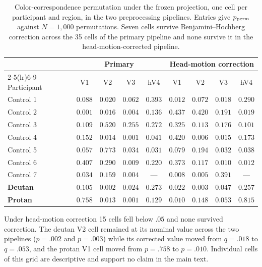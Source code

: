 \begin{table}[h]
\centering
\caption{Color-correspondence permutation under the frozen projection, one cell per participant and region, in the two preprocessing pipelines. Entries give $p_{\rm perm}$ against $N = 1{,}000$ permutations. Seven cells survive Benjamini--Hochberg correction across the 35 cells of the primary pipeline and none survive it in the head-motion-corrected pipeline.}
\label{tab:color_specificity}
\begin{tabular}{lcccccccc}
\toprule
 & \multicolumn{4}{c}{Primary} & \multicolumn{4}{c}{Head-motion correction} \\
\cmidrule(lr){2-5}\cmidrule(lr){6-9}
Participant & V1 & V2 & V3 & hV4 & V1 & V2 & V3 & hV4 \\
\midrule
Control 1 & $0.088$ & $0.020$ & $0.062$ & $0.393$ & $0.012$ & $0.072$ & $0.018$ & $0.290$ \\
Control 2 & $0.001$ & $0.016$ & $0.004$ & $0.136$ & $0.437$ & $0.420$ & $0.191$ & $0.019$ \\
Control 3 & $0.109$ & $0.520$ & $0.255$ & $0.272$ & $0.325$ & $0.113$ & $0.176$ & $0.101$ \\
Control 4 & $0.152$ & $0.014$ & $0.001$ & $0.041$ & $0.420$ & $0.006$ & $0.015$ & $0.173$ \\
Control 5 & $0.057$ & $0.773$ & $0.034$ & $0.031$ & $0.079$ & $0.194$ & $0.032$ & $0.038$ \\
Control 6 & $0.407$ & $0.290$ & $0.009$ & $0.220$ & $0.373$ & $0.117$ & $0.010$ & $0.012$ \\
Control 7 & $0.034$ & $0.159$ & $0.004$ & --- & $0.008$ & $0.005$ & $0.391$ & --- \\
\textbf{Deutan} & $0.105$ & $0.002$ & $0.024$ & $0.273$ & $0.022$ & $0.003$ & $0.047$ & $0.257$ \\
\textbf{Protan} & $0.758$ & $0.013$ & $0.001$ & $0.129$ & $0.010$ & $0.148$ & $0.053$ & $0.815$ \\
\bottomrule
\end{tabular}
\end{table}

Under head-motion correction 15 cells fell below $.05$ and none survived correction. The deutan V2 cell remained at its nominal value across the two pipelines ($p = .002$ and $p = .003$) while its corrected value moved from $q = .018$ to $q = .053$, and the protan V1 cell moved from $p = .758$ to $p = .010$. Individual cells of this grid are descriptive and support no claim in the main text.

